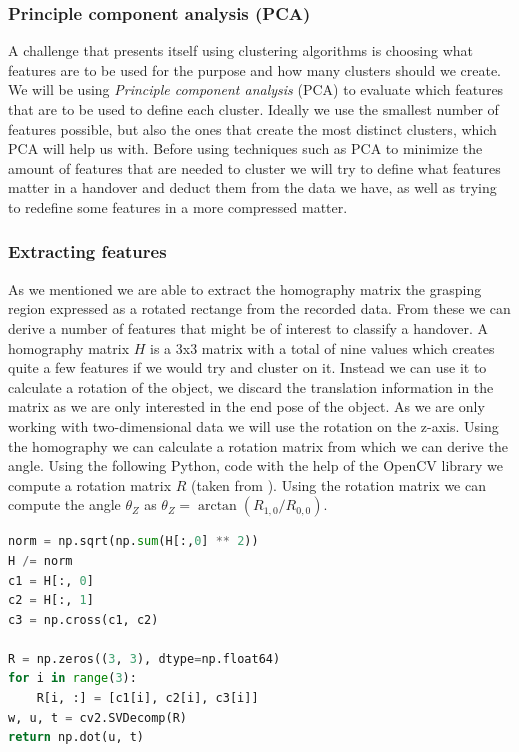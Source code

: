 \subsubsection{Principle component analysis (PCA)}

A challenge that presents itself using clustering algorithms is choosing what features are to be used for the purpose and how many clusters should we create. We will be using \emph{Principle component analysis} (PCA) to evaluate which features that are to be used to define each cluster. Ideally we use the smallest number of features possible, but also the ones that create the most distinct clusters, which PCA will help us with. Before using techniques such as PCA to minimize the amount of features that are needed to cluster we will try to define what features matter in a handover and deduct them from the data we have, as well as trying to redefine some features in a more compressed matter.

\subsubsection{Extracting features}

As we mentioned we are able to extract the homography matrix the grasping region expressed as a rotated rectange from the recorded data. From these we can derive a number of features that might be of interest to classify a handover. A homography matrix \(H\) is a 3x3 matrix with a total of nine values which creates quite a few features if we would try and cluster on it. Instead we can use it to calculate a rotation of the object, we discard the translation information in the matrix as we are only interested in the end pose of the object. As we are only working with two-dimensional data we will use the rotation on the z-axis. Using the homography we can calculate a rotation matrix from which we can derive the angle. Using the following Python, code with the help of the OpenCV library we compute a rotation matrix \(R\) (taken from \parencite{OpenCVHomographyDemo}). Using the rotation matrix we can compute the angle \(\theta_Z\) as \(\theta_Z = \arctan(R_{1,0} / R_{0,0})\).

\begin{lstlisting}[language=Python]
norm = np.sqrt(np.sum(H[:,0] ** 2))
H /= norm
c1 = H[:, 0]
c2 = H[:, 1]
c3 = np.cross(c1, c2)

R = np.zeros((3, 3), dtype=np.float64)
for i in range(3):
	R[i, :] = [c1[i], c2[i], c3[i]]
w, u, t = cv2.SVDecomp(R)
return np.dot(u, t)
\end{lstlisting}

